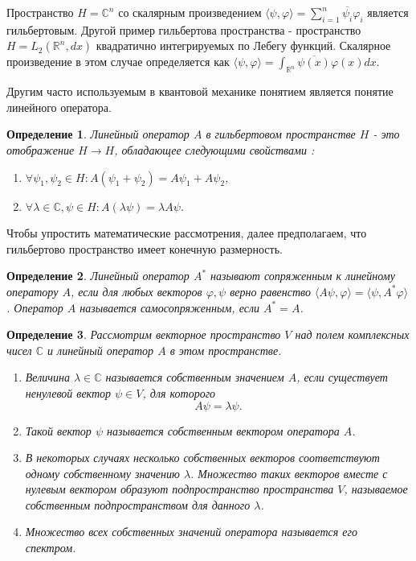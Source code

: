 \documentclass[%
master,         %
subf,           %
href,           %
,times         %
]{disser}
\numberwithin{equation}{section}
\numberwithin{figure}{section}
\newtheorem{definition}{Определение}[section]
\begin{document}
Пространство $H = \mathbb{C}^n$ со скалярным произведением $\langle\psi, \varphi \rangle = \sum_{i = 1}^n \overline{\psi_i}\varphi_i$ является гильбертовым. Другой пример гильбертова пространства - пространство $H = L_2(\mathbb{R}^n, dx)$ квадратично интегрируемых по Лебегу функций. Скалярное произведение в этом случае определяется как $\langle\psi, \varphi \rangle = \int_{\mathbb{R}^n}\overline{\psi(x)}\varphi(x) dx$.

Другим часто используемым в квантовой механике понятием является понятие линейного оператора.
\begin{definition}
Линейный оператор $A$ в гильбертовом пространстве $H$ - это отображение $H \to H$, обладающее следующими свойствами :
\begin{enumerate}
\item $\forall \psi_1,\psi_2\in H: A(\psi_1 + \psi_2) = A\psi_1 + A\psi_2 $,
\item $\forall\lambda\in\mathbb{C}, \psi\in H: A(\lambda\psi) = \lambda A\psi$.
\end{enumerate}
\end{definition}

Чтобы упростить математические рассмотрения, далее предполагаем, что гильбертово пространство имеет конечную размерность.

\begin{definition}
Линейный оператор $A^*$ называют сопряженным к линейному оператору $A$, если для любых векторов $\varphi, \psi$ верно равенство $\langle A\psi,\varphi\rangle = \langle\psi, A^*\varphi\rangle$. Оператор $A$ называется самосопряженным, если $A^* = A$.
\end{definition}

\begin{definition}
Рассмотрим векторное пространство $V$ над полем комплексных чисел $\mathbb{C}$ и линейный оператор $A$ в этом пространстве.
\begin{enumerate}
\item Величина $\lambda\in \mathbb{C}$ называется собственным значением $A$, если существует ненулевой вектор $\psi\in V$, для которого
\[
A\psi = \lambda\psi.
\]
\item Такой вектор $\psi$ называется собственным вектором оператора $A$.
\item В некоторых случаях несколько собственных векторов соответствуют одному собственному значению $\lambda$. Множество таких векторов вместе с нулевым вектором образуют подпространство пространства $V$, называемое собственным подпространством для данного $\lambda$.
\item Множество всех собственных значений оператора называется его спектром.
\end{enumerate}
\end{definition}
\end{document}
